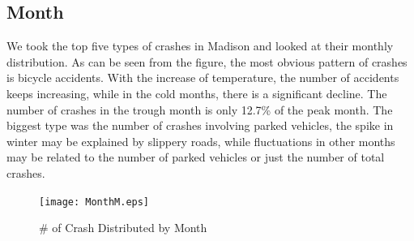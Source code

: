 \documentclass[15pt]{article}
\begin{document}
\subsection{Month}
We took the top five types of crashes in Madison and looked at their monthly distribution. As can be seen from the figure, the most obvious pattern of crashes is bicycle accidents. With the increase of temperature, the number of accidents keeps increasing, while in the cold months, there is a significant decline. The number of crashes in the trough month is only 12.7\% of the peak month. The biggest type was the number of crashes involving parked vehicles, the spike in winter may be explained by slippery roads, while fluctuations in other months may be related to the number of parked vehicles or just the number of total crashes.
\begin{figure}[H]
\centering
\texttt{[image: MonthM.eps]}
\caption{\# of Crash Distributed by Month}
\end{figure}

\newpage
\end{document}
